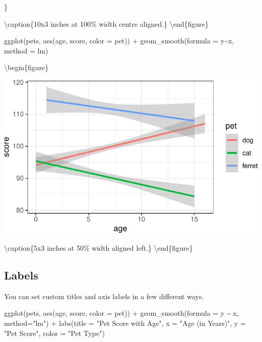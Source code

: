 \documentclass[
  oneside]{book}
\newenvironment{Shaded}{\begin{snugshade}}{\end{snugshade}}
\newcommand{\AttributeTok}[1]{\textcolor[rgb]{0.77,0.63,0.00}{#1}}
\newcommand{\FunctionTok}[1]{\textcolor[rgb]{0.00,0.00,0.00}{#1}}
\newcommand{\NormalTok}[1]{#1}
\newcommand{\SpecialCharTok}[1]{\textcolor[rgb]{0.00,0.00,0.00}{#1}}
\newcommand{\StringTok}[1]{\textcolor[rgb]{0.31,0.60,0.02}{#1}}
\begin{document}
\}

\textbackslash caption\{10x3 inches at 100\% width centre aligned.\}\label{fig:fig-chunk-example1-out}
\textbackslash end\{figure\}

\begin{Shaded}
\begin{Highlighting}[]
\FunctionTok{ggplot}\NormalTok{(pets, }\FunctionTok{aes}\NormalTok{(age, score, }\AttributeTok{color =}\NormalTok{ pet)) }\SpecialCharTok{+}
  \FunctionTok{geom\_smooth}\NormalTok{(}\AttributeTok{formula =}\NormalTok{ y}\SpecialCharTok{\textasciitilde{}}\NormalTok{x, }\AttributeTok{method =}\NormalTok{ lm)}
\end{Highlighting}
\end{Shaded}

\textbackslash begin\{figure\}

\includegraphics[width=0.5\linewidth]{images/fig-chunk-example2-out-1} \hfill{}

\textbackslash caption\{5x3 inches at 50\% width aligned left.\}\label{fig:fig-chunk-example2-out}
\textbackslash end\{figure\}

\hypertarget{custom-labels}{%
\subsection{Labels}\label{custom-labels}}

You can set custom titles and axis labels in a few different ways.

\begin{Shaded}
\begin{Highlighting}[]
\FunctionTok{ggplot}\NormalTok{(pets, }\FunctionTok{aes}\NormalTok{(age, score, }\AttributeTok{color =}\NormalTok{ pet)) }\SpecialCharTok{+}
  \FunctionTok{geom\_smooth}\NormalTok{(}\AttributeTok{formula =}\NormalTok{ y }\SpecialCharTok{\textasciitilde{}}\NormalTok{ x, }\AttributeTok{method=}\StringTok{"lm"}\NormalTok{) }\SpecialCharTok{+}
  \FunctionTok{labs}\NormalTok{(}\AttributeTok{title =} \StringTok{"Pet Score with Age"}\NormalTok{,}
       \AttributeTok{x =} \StringTok{"Age (in Years)"}\NormalTok{,}
       \AttributeTok{y =} \StringTok{"Pet Score"}\NormalTok{,}
       \AttributeTok{color =} \StringTok{"Pet Type"}\NormalTok{)}
\end{Highlighting}
\end{Shaded}
\end{document}
